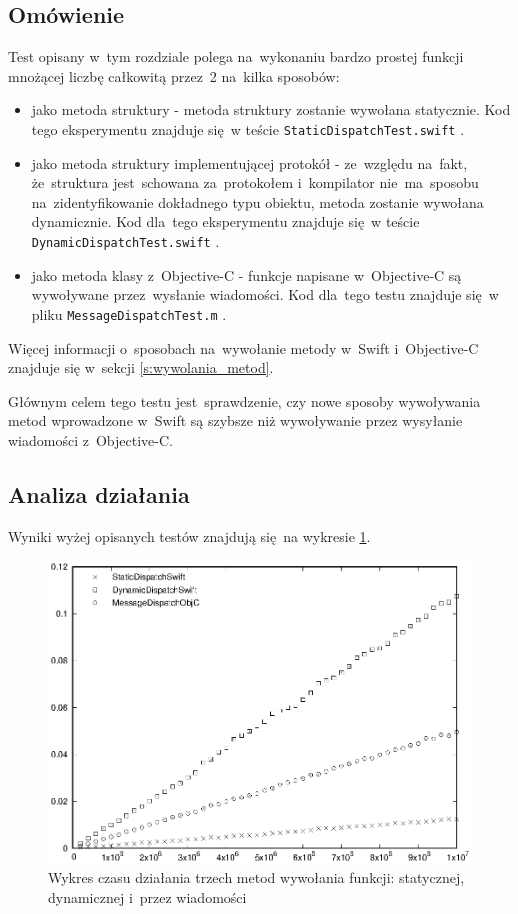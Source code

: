 \documentclass[mgr, shortabstract]{iithesis}
\newcommand{\swiftinline}[1]{
    \texttt{#1}
}
\begin{document}
\subsection{Omówienie}

Test opisany w~tym rozdziale polega na~wykonaniu bardzo prostej funkcji mnożącej liczbę całkowitą przez~2 na~kilka sposobów:

\begin{itemize}
    \item jako metoda struktury - metoda struktury zostanie wywołana statycznie. Kod tego eksperymentu znajduje się w teście \swiftinline{StaticDispatchTest.swift}.
    \item jako metoda struktury implementującej protokół - ze~względu na~fakt, że~struktura jest~schowana za~protokołem i~kompilator nie~ma~sposobu na~zidentyfikowanie dokładnego typu obiektu, metoda zostanie wywołana dynamicznie. Kod dla~tego eksperymentu znajduje się w teście \swiftinline{DynamicDispatchTest.swift}.
    \item jako metoda klasy z~Objective-C - funkcje napisane w~Objective-C są wywoływane przez~wysłanie wiadomości. Kod dla~tego testu znajduje się w pliku \swiftinline{MessageDispatchTest.m}.
\end{itemize}

Więcej informacji o~sposobach na~wywołanie metody w~Swift i~Objective-C znajduje się w~sekcji \ref{s:wywolania_metod}.

Głównym celem tego testu jest~sprawdzenie, czy nowe sposoby wywoływania metod wprowadzone w~Swift są szybsze niż wywoływanie przez wysyłanie wiadomości z~Objective-C.

\subsection{Analiza działania}

Wyniki wyżej opisanych testów znajdują się na wykresie \ref{p:dispatch_method}.

\begin{figure}[ht]
    \includegraphics{plots/Dispatch.eps}
    \caption{Wykres czasu działania trzech metod wywołania funkcji: statycznej, dynamicznej i~przez wiadomości}
    \label{p:dispatch_method}
\end{figure}
\end{document}

